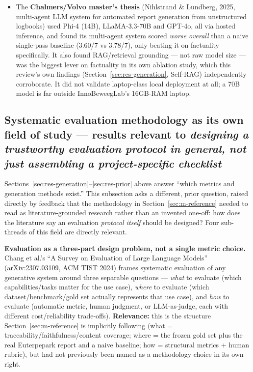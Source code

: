 \begin{itemize}
\item The \textbf{Chalmers/Volvo master's thesis} (Nihlstrand \& Lundberg, 2025, multi-agent LLM system for automated report generation from unstructured logbooks) used Phi-4 (14B), LLaMA-3.3-70B and GPT-4o, all via hosted inference, and found its multi-agent system scored \textit{worse overall} than a naive single-pass baseline (3.60/7 vs 3.78/7), only beating it on factuality specifically. It also found RAG/retrieval grounding — not raw model size — was the biggest lever on factuality in its own ablation study, which this review's own findings (Section~\ref{sec:res-generation}, Self-RAG) independently corroborate. It did not validate laptop-class local deployment at all; a 70B model is far outside InnoBeweegLab's 16GB-RAM laptop.
\end{itemize}

\subsection{Systematic evaluation methodology as its own field of study — results relevant to \textit{designing a trustworthy evaluation protocol in general, not just assembling a project-specific checklist}}\label{sec:res-evalmethod}

Sections~\ref{sec:res-generation}--\ref{sec:res-prior} above answer \textquotedblleft{}which metrics and generation methods exist.\textquotedblright{} This subsection asks a different, prior question, raised directly by feedback that the methodology in Section~\ref{sec:m-reference} needed to read as literature-grounded research rather than an invented one-off: how does the literature say an evaluation \textit{protocol itself} should be designed? Four sub-threads of this field are directly relevant.



\textbf{Evaluation as a three-part design problem, not a single metric choice.} Chang et al.'s \textquotedblleft{}A Survey on Evaluation of Large Language Models\textquotedblright{} (arXiv:2307.03109, ACM TIST 2024) frames systematic evaluation of any generative system around three separable questions — \textit{what} to evaluate (which capabilities/tasks matter for the use case), \textit{where} to evaluate (which dataset/benchmark/gold set actually represents that use case), and \textit{how} to evaluate (automatic metric, human judgment, or LLM-as-judge, each with different cost/reliability trade-offs). \textbf{Relevance:} this is the structure Section~\ref{sec:m-reference} is implicitly following (what = traceability/faithfulness/content coverage; where = the frozen gold set plus the real Euterpepark report and a naive baseline; how = structural metrics + human rubric), but had not previously been named as a methodology choice in its own right.



